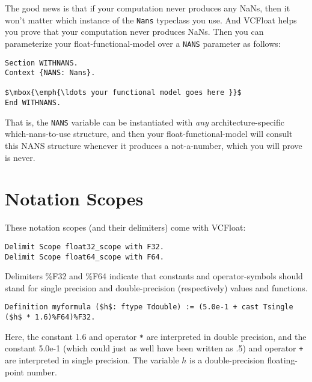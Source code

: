 \documentclass[article]{memoir}
\begin{document}
The good news is that if your computation never produces any
NaNs, then it won't matter which instance of the \lstinline{Nans}
typeclass you use.  And VCFloat helps you prove that your computation
never produces NaNs.
Then you can parameterize your float-functional-model
over a \lstinline{NANS} parameter
 as follows:

\begin{lstlisting}
Section WITHNANS.
Context {NANS: Nans}.

$\mbox{\emph{\ldots your functional model goes here }}$
End WITHNANS.
\end{lstlisting}
That is, the \lstinline{NANS} variable can be instantiated with
\emph{any} architecture-specific which-nans-to-use structure,
and then your float-functional-model will consult this NANS
structure whenever it produces a not-a-number, which you will prove
is never.

\chapter{Notation Scopes}
\label{notation}
These notation scopes (and their delimiters) come with VCFloat:
\begin{lstlisting}
Delimit Scope float32_scope with F32.
Delimit Scope float64_scope with F64.
\end{lstlisting}

Delimiters \%F32 and \%F64 indicate that constants and operator-symbols should stand for single precision and double-precision (respectively) values and functions.
\begin{lstlisting}
Definition myformula ($h$: ftype Tdouble) := (5.0e-1 + cast Tsingle ($h$ * 1.6)%F64)%F32.
\end{lstlisting}
Here, the constant 1.6 and operator \lstinline{*} are
interpreted in double precision,
and the constant 5.0e-1 (which could just as well have been written
as .5) and operator \lstinline{+} are interpreted in single precision.
The variable $h$ is a double-precision floating-point number.
\end{document}

